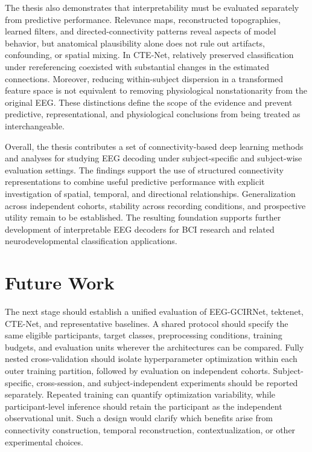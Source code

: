 The thesis also demonstrates that interpretability must be evaluated separately from predictive performance. Relevance maps, reconstructed topographies, learned filters, and directed-connectivity patterns reveal aspects of model behavior, but anatomical plausibility alone does not rule out artifacts, confounding, or spatial mixing. In CTE-Net, relatively preserved classification under rereferencing coexisted with substantial changes in the estimated connections. Moreover, reducing within-subject dispersion in a transformed feature space is not equivalent to removing physiological nonstationarity from the original EEG. These distinctions define the scope of the evidence and prevent predictive, representational, and physiological conclusions from being treated as interchangeable.

Overall, the thesis contributes a set of connectivity-based deep learning methods and analyses for studying EEG decoding under subject-specific and subject-wise evaluation settings. The findings support the use of structured connectivity representations to combine useful predictive performance with explicit investigation of spatial, temporal, and directional relationships. Generalization across independent cohorts, stability across recording conditions, and prospective utility remain to be established. The resulting foundation supports further development of interpretable EEG decoders for BCI research and related neurodevelopmental classification applications.

\section{Future Work}
The next stage should establish a unified evaluation of EEG-GCIRNet, \gls{tektenet}, CTE-Net, and representative baselines. A shared protocol should specify the same eligible participants, target classes, preprocessing conditions, training budgets, and evaluation units wherever the architectures can be compared. Fully nested cross-validation should isolate hyperparameter optimization within each outer training partition, followed by evaluation on independent cohorts. Subject-specific, cross-session, and subject-independent experiments should be reported separately. Repeated training can quantify optimization variability, while participant-level inference should retain the participant as the independent observational unit. Such a design would clarify which benefits arise from connectivity construction, temporal reconstruction, contextualization, or other experimental choices.

